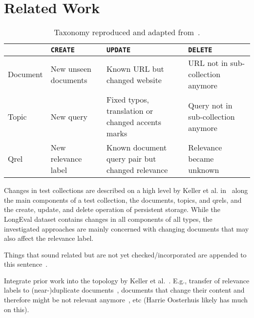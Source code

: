 \section{Related Work}


\begin{table}
    \caption{Taxonomy reproduced and adapted from~\cite{keller:2024}.}
    \label{tab:CRUD}
    \begin{tabularx}{\linewidth}{l | X | X | X}
        \toprule
        {}       & \texttt{CREATE}          & \texttt{UPDATE}                 & \texttt{DELETE} \\ \midrule
        Document & New unseen documents     & Known URL but changed website   & URL not in sub-collection anymore              \\\midrule
        Topic    & New query                & Fixed typos, translation or changed accents marks                               & Query not in sub-collection anymore \\\midrule
        Qrel     & New relevance label      & Known document query pair but changed relevance & Relevance became unknown   \\\bottomrule
    \end{tabularx}
\end{table}

Changes in test collections are described on a high level by Keller et al. in~\cite{keller:2024} along the main components of a test collection, the documents, topics, and qrels, and the create, update, and delete operation of persistent storage. While the LongEval dataset contains changes in all components of all types, the investigated approaches are mainly concerned with changing documents that may also affect the relevance label.






Things that sound related but are not yet checked/incorporated are appended to this sentence~\cite{li:2022}.

Integrate prior work into the topology by Keller et al.~\cite{keller:2024}. E.g., transfer of relevance labels to (near-)duplicate documents~\cite{froebe:2021a}, documents that change their content and therefore might be not relevant anymore~\cite{froebe:2022d}, etc (Harrie Oosterhuis likely has much on this).


